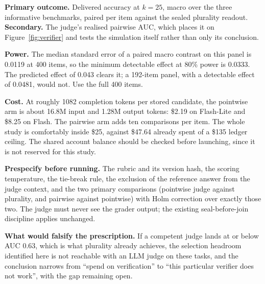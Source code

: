 \documentclass[11pt]{article}
\begin{document}
\textbf{Primary outcome.} Delivered accuracy at $k=25$, macro over the three informative benchmarks,
paired per item against the sealed plurality readout. \textbf{Secondary.} The judge's realised
pairwise AUC, which places it on Figure~\ref{fig:verifier} and tests the simulation itself rather
than only its conclusion.

\textbf{Power.} The median standard error of a paired macro contrast on this panel is 0.0119 at 400
items, so the minimum detectable effect at 80\% power is 0.0333. The predicted effect of 0.043
clears it; a 192-item panel, with a detectable effect of 0.0481, would not. Use the full 400 items.

\textbf{Cost.} At roughly 1082 completion tokens per stored candidate, the pointwise arm is about
16.8M input and 1.28M output tokens: \$2.19 on Flash-Lite and \$8.25 on Flash. The pairwise arm adds
ten comparisons per item. The whole study is comfortably inside \$25, against \$47.64 already spent
of a \$135 ledger ceiling. The shared account balance should be checked before launching, since it
is not reserved for this study.

\textbf{Prespecify before running.} The rubric and its version hash, the scoring temperature, the
tie-break rule, the exclusion of the reference answer from the judge context, and the two primary
comparisons (pointwise judge against plurality, and pairwise against pointwise) with Holm
correction over exactly those two. The judge must never see the grader output; the existing
seal-before-join discipline applies unchanged.

\textbf{What would falsify the prescription.} If a competent judge lands at or below AUC 0.63, which is what plurality already achieves, the
selection headroom identified here is not reachable with an LLM judge on these tasks, and the
conclusion narrows from ``spend on verification'' to ``this particular verifier does not work'', with
the gap remaining open.
\end{document}
